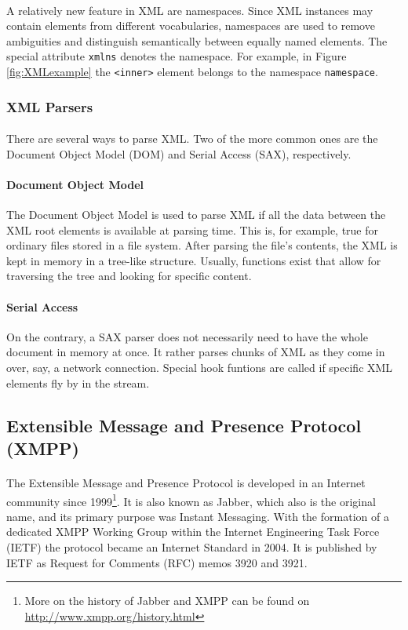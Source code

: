 \paragraph{}
A relatively new feature in XML are namespaces. Since XML instances may contain elements from different vocabularies, namespaces are used to remove ambiguities and distinguish semantically between equally nam\-ed elements. The special attribute \texttt{xmlns} denotes the namespace. For example, in Figure \ref{fig:XMLexample} the \texttt{<inner>} element belongs to the namespace \texttt{namespace}.

\subsubsection{XML Parsers}
\paragraph{}
There are several ways to parse XML. Two of the more common ones are the Document Object Model (DOM) and Serial Access (SAX), respectively.
\paragraph{Document Object Model}
The Document Object Model is used to parse XML if all the data between the XML root elements is available at parsing time. This is, for example, true for ordinary files stored in a file system. After parsing the file's contents, the XML is kept in memory in a tree-like structure. Usually, functions exist that allow for traversing the tree and looking for specific content.

\paragraph{Serial Access}
On the contrary, a SAX parser does not necessarily need to have the whole document in memory at once. It rather parses chunks of XML as they come in over, say, a network connection. Special hook funtions are called if specific XML elements fly by in the stream.


\subsection{Extensible Message and Presence Protocol (XMPP)}
\label{sec:xmpp}
\paragraph{}
The Extensible Message and Presence Protocol is developed in an Internet community since 1999\footnote{More on the history of Jabber and XMPP can be found on \href{http://www.xmpp.org/history.html}{http://www.xmpp.org/history.html}}. It is also known as Jabber, which also is the original name, and its primary purpose was Instant Messaging. With the formation of a dedicated XMPP Working Group within the Internet Engineering Task Force (IETF) the protocol became an Internet Standard in 2004. It is published by IETF as Request for Comments (RFC) memos 3920 and 3921.
